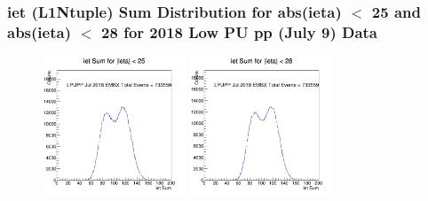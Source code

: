 \documentclass{beamer}
\begin{document}
\begin{frame}
\frametitle{iet (L1Ntuple) Sum Distribution for abs(ieta) $<$ 25 and abs(ieta) $<$ 28 for 2018 Low PU pp (July 9) Data} 

\begin{figure}
\includegraphics[width=0.38\textwidth]{Plots/pp/iETSumHisLT25.png}
\includegraphics[width=0.38\textwidth]{Plots/pp/iETSumHisLT28.png}
\end{figure}
\end{frame}
\end{document}
